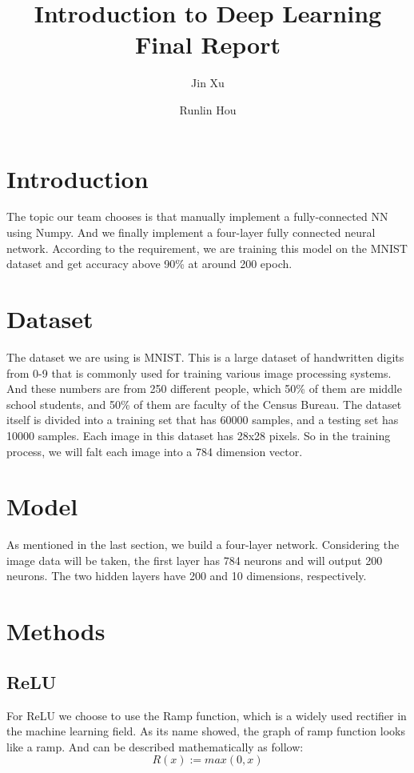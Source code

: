 \documentclass[12pt]{article}
\begin{document}
\title{\textbf{Introduction to Deep Learning Final Report}}
\author{Jin Xu \and Runlin Hou}    
\maketitle


\section{Introduction}
The topic our team chooses is that manually implement a fully-connected NN using Numpy. And 
we finally implement a four-layer fully connected neural network. According to the requirement, 
we are training this model on the MNIST dataset and get accuracy above 90\% at around 200 
epoch.

\section{Dataset}
The dataset we are using is MNIST. This is a large dataset of handwritten digits from 0-9 that 
is commonly used for training various image processing systems. And these numbers are from 250 
different people, which 50\% of them are middle school students, and 50\% of them are faculty 
of the Census Bureau. The dataset itself is divided into a training set that has 60000 samples, 
and a testing set has 10000 samples.  Each image in this dataset has 28x28 pixels. So in the 
training process, we will falt each image into a 784 dimension vector.

\section{Model}
As mentioned in the last section, we build a four-layer network. Considering the image data will be taken, the first layer has 784 neurons and will output 200 neurons. The two hidden layers have 200 and 10 dimensions, respectively.

\section{Methods}
\subsection*{ReLU}
For ReLU we choose to use the Ramp function, which is a widely used rectifier in the machine 
learning field. As its name showed, the graph of ramp function looks like a ramp. And can be 
described mathematically as follow:
\begin{equation*}
    R(x):=max(0,x)
\end{equation*}
\end{document}
